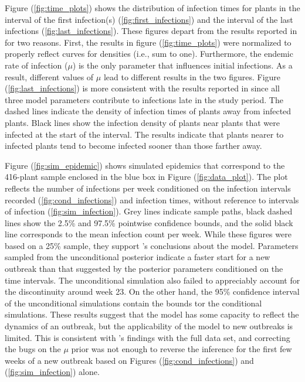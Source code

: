\documentclass{uwstat572}
\begin{document}
Figure (\ref{fig:time_plots}) shows the distribution of infection times for plants in the interval of the first infection(s)  (\ref{fig:first_infections}) and the interval of the last infections (\ref{fig:last_infections}). 
These figures depart from the results reported in \citet{Brown} for two reasons. 
First, the results in figure (\ref{fig:time_plots}) were normalized to properly reflect curves for densities (i.e., sum to one). 
Furthermore, the endemic rate of infection ($\mu$) is the only parameter that influences initial infections. 
As a result, different values of $\mu$ lead to different results in the two figures. 
Figure (\ref{fig:last_infections}) is more consistent with the results reported in \citet{Brown} since all three model parameters contribute to infections late in the study period. 
The dashed lines indicate the density of infection times of plants away from infected plants. 
Black lines show the infection density of plants near plants that were infected at the start of the interval. 
The results indicate that plants nearer to infected plants tend to become infected sooner than those farther away. 

Figure (\ref{fig:sim_epidemic}) shows simulated epidemics that correspond to the 416-plant sample enclosed in the blue box in Figure (\ref{fig:data_plot}). 
The plot reflects the number of infections per week conditioned on the infection intervals recorded (\ref{fig:cond_infections}) and infection times, without reference to intervals of infection (\ref{fig:sim_infection}). 
Grey lines indicate sample paths, black dashed lines show the 2.5\% and 97.5\% pointwise confidence bounds, and the solid black line corresponds to the mean infection count per week. 
While these figures were based on a 25\% sample, they support \citep{Brown}'s conclusions about the model.
Parameters sampled from the unconditional posterior indicate a faster start for a new outbreak than that suggested by the posterior parameters conditioned on the time intervals.
The unconditional simulation also failed to appreciably account for the discontinuity around week 23. 
On the other hand, the 95\% confidence interval of the unconditional simulations contain the bounds tor the conditional simulations. 
These results suggest that the model has some capacity to reflect the dynamics of an outbreak, but the applicability of the model to new outbreaks is limited.
This is consistent with \citet{Brown}'s findings with the full data set, and correcting the bugs on the $\mu$ prior was not enough to reverse the inference for the first few weeks of a new outbreak based on Figures (\ref{fig:cond_infections}) and (\ref{fig:sim_infection}) alone. 
\end{document}

